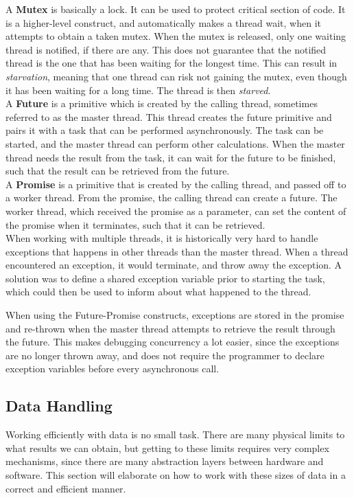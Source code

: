 \documentclass[a4paper]{article}
\begin{document}
A \textbf{Mutex} is basically a lock. It can be used to protect critical section of code. It is a higher-level construct, and automatically makes a thread wait, when it attempts to obtain a taken mutex. When the mutex is released, only one waiting thread is notified, if there are any. This does not guarantee that the notified thread is the one that has been waiting for the longest time. This can result in \textit{starvation}, meaning that one thread can risk not gaining the mutex, even though it has been waiting for a long time. The thread is then \textit{starved}.\\

A \textbf{Future} is a primitive which is created by the calling thread, sometimes referred to as the master thread. This thread creates the future primitive and pairs it with a task that can be performed asynchronously. The task can be started, and the master thread can perform other calculations. When the master thread needs the result from the task, it can wait for the future to be finished, such that the result can be retrieved from the future.\\

A \textbf{Promise} is a primitive that is created by the calling thread, and passed off to a worker thread. From the promise, the calling thread can create a future. The worker thread, which received the promise as a parameter, can set the content of the promise when it terminates, such that it can be retrieved.\\

When working with multiple threads, it is historically very hard to handle exceptions that happens in other threads than the master thread. When a thread encountered an exception, it would terminate, and throw away the exception. A solution was to define a shared exception variable prior to starting the task, which could then be used to inform about what happened to the thread. 

When using the Future-Promise constructs, exceptions are stored in the promise and re-thrown when the master thread attempts to retrieve the result through the future. This makes debugging concurrency a lot easier, since the exceptions are no longer thrown away, and does not require the programmer to declare exception variables before every asynchronous call.


\newpage
\subsection{Data Handling}
Working efficiently with data is no small task. There are many physical limits to what results we can obtain, but getting to these limits requires very complex mechanisms, since there are many abstraction layers between hardware and software. This section will elaborate on how to work with these sizes of data in a correct and efficient manner.
\end{document}
